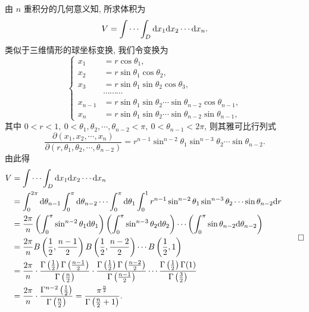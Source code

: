 \begin{solve}
由 $n$ 重积分的几何意义知, 所求体积为
\[
  V=\idotsint_D \mathrm dx_1\mathrm dx_2\cdots\mathrm dx_n.
\]
类似于三维情形的球坐标变换, 我们令变换为
\[
\left\{
\begin{aligned}
  x_1&=r\cos\theta_1,\\
  x_2&=r\sin\theta_1\cos\theta_2,\\
  x_3&=r\sin\theta_1\sin\theta_2\cos\theta_3,\\
  &\cdots\cdots\cdots\\
  x_{n-1}&=r\sin\theta_1\sin\theta_2\cdots\sin\theta_{n-2}\cos\theta_{n-1},\\
  x_n&=r\sin\theta_1\sin\theta_2\cdots\sin\theta_{n-2}\sin\theta_{n-1},
\end{aligned}
\right.
\]
其中 $0<r<1,\ 0<\theta_1,\theta_2,\cdots,\theta_{n-2}<\pi,\ 0<\theta_{n-1}<2\pi$, 则其雅可比行列式
\[
  \frac{\partial(x_1,x_2,\cdots,x_n)}
  {\partial(r,\theta_1,\theta_2,\cdots,\theta_{n-2})}
  =r^{n-1}\sin^{n-2}\theta_1\sin^{n-3}\theta_2\cdots\sin\theta_{n-2}.
\]
由此得
\[
\begin{aligned}
  V
  &=\idotsint_D \mathrm dx_1\mathrm dx_2\cdots\mathrm dx_n\\
  &=\int_0^{2\pi}\mathrm d\theta_{n-1}\int_0^\pi\mathrm d\theta_{n-2}
    \cdots\int_0^\pi\mathrm d\theta_1\int_0^1
    r^{n-1}\sin^{n-2}\theta_1\sin^{n-3}\theta_2\cdots
    \sin\theta_{n-2}\mathrm dr\\
  &=\frac{2\pi}{n}
    \left(\int_0^\pi\sin^{n-2}\theta_1\mathrm d\theta_1\right)
    \left(\int_0^\pi\sin^{n-3}\theta_2\mathrm d\theta_2\right)\cdots
    \left(\int_0^\pi\sin\theta_{n-2}\mathrm d\theta_{n-2}\right)\\
  &=\frac{2\pi}{n}
    B\left(\frac12,\frac{n-1}{2}\right)
    B\left(\frac12,\frac{n-2}{2}\right)\cdots B\left(\frac12,1\right)\\
  &=\frac{2\pi}{n}\cdot
    \frac{\Gamma\left(\frac12\right)\Gamma\left(\frac{n-1}{2}\right)}{\Gamma\left(\frac n2\right)}
    \cdot
    \frac{\Gamma\left(\frac12\right)\Gamma\left(\frac{n-2}{2}\right)}{\Gamma\left(\frac{n-1}{2}\right)}
    \cdots
    \frac{\Gamma\left(\frac12\right)\Gamma(1)}{\Gamma\left(\frac32\right)}\\
  &=\frac{2\pi}{n}\cdot
    \frac{\Gamma^{n-2}\left(\frac12\right)}{\Gamma\left(\frac n2\right)}
  =\frac{\pi^{\frac n2}}{\Gamma\left(\frac n2+1\right)}.
\end{aligned}
\qedhere
\]
\end{solve}


